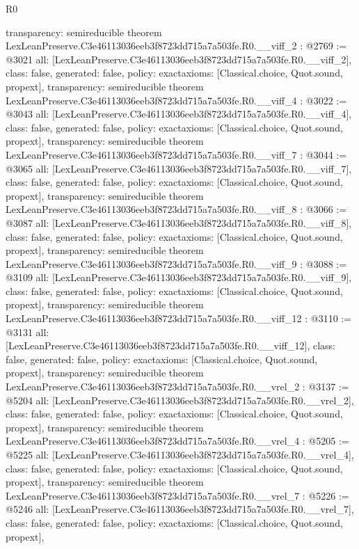 \begin{lexlean}{R0}
\begin{coremodule}
{  transparency: semireducible
}
theorem LexLeanPreserve.C3e46113036eeb3f8723dd715a7a503fe.R0.__viff_2 : @2769 := @3021 {
  all: [LexLeanPreserve.C3e46113036eeb3f8723dd715a7a503fe.R0.__viff_2],
  class: false,
  generated: false,
  policy: exact{axioms: [Classical.choice, Quot.sound, propext]},
  transparency: semireducible
}
theorem LexLeanPreserve.C3e46113036eeb3f8723dd715a7a503fe.R0.__viff_4 : @3022 := @3043 {
  all: [LexLeanPreserve.C3e46113036eeb3f8723dd715a7a503fe.R0.__viff_4],
  class: false,
  generated: false,
  policy: exact{axioms: [Classical.choice, Quot.sound, propext]},
  transparency: semireducible
}
theorem LexLeanPreserve.C3e46113036eeb3f8723dd715a7a503fe.R0.__viff_7 : @3044 := @3065 {
  all: [LexLeanPreserve.C3e46113036eeb3f8723dd715a7a503fe.R0.__viff_7],
  class: false,
  generated: false,
  policy: exact{axioms: [Classical.choice, Quot.sound, propext]},
  transparency: semireducible
}
theorem LexLeanPreserve.C3e46113036eeb3f8723dd715a7a503fe.R0.__viff_8 : @3066 := @3087 {
  all: [LexLeanPreserve.C3e46113036eeb3f8723dd715a7a503fe.R0.__viff_8],
  class: false,
  generated: false,
  policy: exact{axioms: [Classical.choice, Quot.sound, propext]},
  transparency: semireducible
}
theorem LexLeanPreserve.C3e46113036eeb3f8723dd715a7a503fe.R0.__viff_9 : @3088 := @3109 {
  all: [LexLeanPreserve.C3e46113036eeb3f8723dd715a7a503fe.R0.__viff_9],
  class: false,
  generated: false,
  policy: exact{axioms: [Classical.choice, Quot.sound, propext]},
  transparency: semireducible
}
theorem LexLeanPreserve.C3e46113036eeb3f8723dd715a7a503fe.R0.__viff_12 : @3110 := @3131 {
  all: [LexLeanPreserve.C3e46113036eeb3f8723dd715a7a503fe.R0.__viff_12],
  class: false,
  generated: false,
  policy: exact{axioms: [Classical.choice, Quot.sound, propext]},
  transparency: semireducible
}
theorem LexLeanPreserve.C3e46113036eeb3f8723dd715a7a503fe.R0.__vrel_2 : @3137 := @5204 {
  all: [LexLeanPreserve.C3e46113036eeb3f8723dd715a7a503fe.R0.__vrel_2],
  class: false,
  generated: false,
  policy: exact{axioms: [Classical.choice, Quot.sound, propext]},
  transparency: semireducible
}
theorem LexLeanPreserve.C3e46113036eeb3f8723dd715a7a503fe.R0.__vrel_4 : @5205 := @5225 {
  all: [LexLeanPreserve.C3e46113036eeb3f8723dd715a7a503fe.R0.__vrel_4],
  class: false,
  generated: false,
  policy: exact{axioms: [Classical.choice, Quot.sound, propext]},
  transparency: semireducible
}
theorem LexLeanPreserve.C3e46113036eeb3f8723dd715a7a503fe.R0.__vrel_7 : @5226 := @5246 {
  all: [LexLeanPreserve.C3e46113036eeb3f8723dd715a7a503fe.R0.__vrel_7],
  class: false,
  generated: false,
  policy: exact{axioms: [Classical.choice, Quot.sound, propext]},
}
\end{coremodule}
\end{lexlean}
